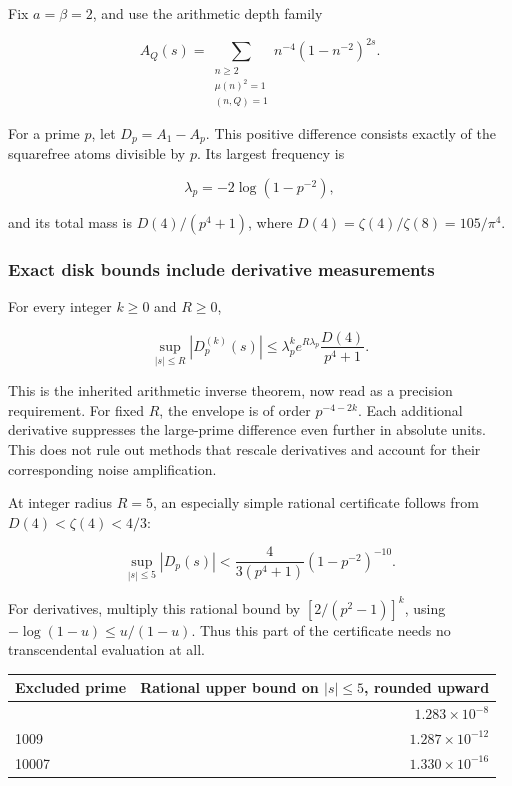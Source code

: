 Fix \(a=\beta=2\), and use the arithmetic depth family

\[
A_Q(s)=\sum_{\substack{n\ge2\\\mu(n)^2=1\\(n,Q)=1}}
 n^{-4}(1-n^{-2})^{2s}.
\]

For a prime \(p\), let \(D_p=A_1-A_p\). This positive difference
consists exactly of the squarefree atoms divisible by \(p\). Its largest
frequency is

\[
\lambda_p=-2\log(1-p^{-2}),
\]

and its total mass is \(D(4)/(p^4+1)\), where
\(D(4)=\zeta(4)/\zeta(8)=105/\pi^4\).

\hypertarget{v11-resolution_full-exact-disk-bounds-include-derivative-measurements}{%
\subsubsection{Exact disk bounds include derivative
measurements}\label{v11-resolution_full-exact-disk-bounds-include-derivative-measurements}}

For every integer \(k\ge0\) and \(R\ge0\),

\[
\sup_{|s|\le R}|D_p^{(k)}(s)|
\le \lambda_p^k e^{R\lambda_p}\frac{D(4)}{p^4+1}.
\tag{RA-4}
\]

This is the inherited arithmetic inverse theorem, now read as a
precision requirement. For fixed \(R\), the envelope is of order
\(p^{-4-2k}\). Each additional derivative suppresses the large-prime
difference even further in absolute units. This does not rule out
methods that rescale derivatives and account for their corresponding
noise amplification.

At integer radius \(R=5\), an especially simple rational certificate
follows from \(D(4)<\zeta(4)<4/3\):

\[
\boxed{\sup_{|s|\le5}|D_p(s)|
 <\frac{4}{3(p^4+1)}(1-p^{-2})^{-10}.}
\tag{RA-5}
\]

For derivatives, multiply this rational bound by \([2/(p^2-1)]^k\),
using \(-\log(1-u)\le u/(1-u)\). Thus this part of the certificate needs
no transcendental evaluation at all.

\begin{longtable}[]{@{}lr@{}}
\toprule\noalign{}
Excluded prime & Rational upper bound on \(|s|\le5\), rounded upward \\
\midrule\noalign{}
\endhead
\bottomrule\noalign{}
\endlastfoot
101 & \(1.283\times10^{-8}\) \\
1009 & \(1.287\times10^{-12}\) \\
10007 & \(1.330\times10^{-16}\) \\
\end{longtable}

